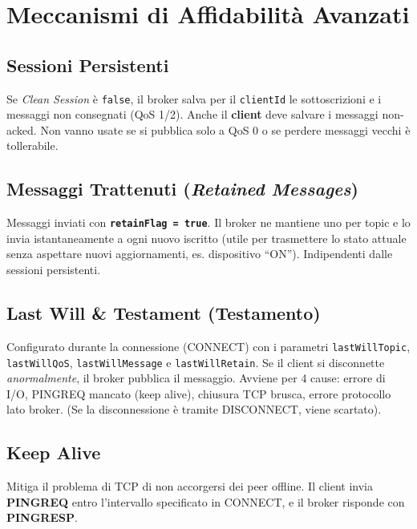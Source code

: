 \documentclass[
  italian,
  openany]{book}
\begin{document}
\section{Meccanismi di Affidabilità
Avanzati}\label{meccanismi-di-affidabilituxe0-avanzati}

\subsection{Sessioni Persistenti}\label{sessioni-persistenti}

Se \emph{Clean Session} è \texttt{false}, il broker salva per il
\texttt{clientId} le sottoscrizioni e i messaggi non consegnati (QoS
1/2). Anche il \textbf{client} deve salvare i messaggi non-acked. Non
vanno usate se si pubblica solo a QoS 0 o se perdere messaggi vecchi è
tollerabile.

\subsection{\texorpdfstring{Messaggi Trattenuti (\emph{Retained
Messages})}{Messaggi Trattenuti (Retained Messages)}}\label{messaggi-trattenuti-retained-messages}

Messaggi inviati con \textbf{\texttt{retainFlag\ =\ true}}. Il broker ne
mantiene uno per topic e lo invia istantaneamente a ogni nuovo iscritto
(utile per trasmettere lo stato attuale senza aspettare nuovi
aggiornamenti, es. dispositivo ``ON''). Indipendenti dalle sessioni
persistenti.

\subsection{Last Will \& Testament
(Testamento)}\label{last-will-testament-testamento}

Configurato durante la connessione (CONNECT) con i parametri
\texttt{lastWillTopic}, \texttt{lastWillQoS}, \texttt{lastWillMessage} e
\texttt{lastWillRetain}. Se il client si disconnette
\emph{anormalmente}, il broker pubblica il messaggio. Avviene per 4
cause: errore di I/O, PINGREQ mancato (keep alive), chiusura TCP brusca,
errore protocollo lato broker. (Se la disconnessione è tramite
DISCONNECT, viene scartato).

\subsection{Keep Alive}\label{keep-alive}

Mitiga il problema di TCP di non accorgersi dei peer offline. Il client
invia \textbf{PINGREQ} entro l'intervallo specificato in CONNECT, e il
broker risponde con \textbf{PINGRESP}.
\end{document}
